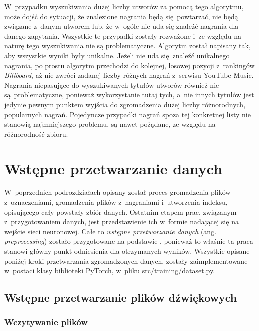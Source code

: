 W~przypadku wyszukiwania dużej liczby utworów za pomocą tego algorytmu, może dojść do sytuacji, że znalezione nagrania będą się powtarzać, nie będą związane z~danym utworem lub, że w~ogóle nie uda się znaleźć nagrania dla danego zapytania. Wszystkie te przypadki zostały rozważone i~ze względu na naturę tego wyszukiwania nie są problematyczne. Algorytm został napisany tak, aby wszystkie wyniki były unikalne. Jeżeli nie uda się znaleźć unikalnego nagrania, po prostu algorytm przechodzi do kolejnej, losowej pozycji z~rankingów \emph{Billboard}, aż nie zwróci zadanej liczby różnych nagrań z~serwisu YouTube Music. Nagrania niepasujące do wyszukiwanych tytułów utworów również nie są problematyczne, ponieważ wykorzystanie tutaj tych, a~nie innych tytułów jest jedynie pewnym punktem wyjścia do zgromadzenia dużej liczby różnorodnych, popularnych nagrań. Pojedyncze przypadki nagrań spoza tej konkretnej listy nie stanowią najmniejszego problemu, są nawet pożądane, ze względu na różnorodność zbioru.

\section{Wstępne przetwarzanie danych} \label{sec:preprocessing}

W~poprzednich podrozdziałach opisany został proces gromadzenia plików z~oznaczeniami, gromadzenia plików z~nagraniami i~utworzenia indeksu, opisującego cały powstały zbiór danych. Ostatnim etapem prac, związanym z~przygotowaniem danych, jest przedstawienie ich w~formie nadającej się na wejście sieci neuronowej. Całe to \emph{wstępne przetwarzanie danych} (ang. \emph{preprocessing}) zostało przygotowane na podstawie \cite{park_bi-directional_2019}, ponieważ to właśnie ta praca stanowi główny punkt odniesienia dla otrzymanych wyników. Wszystkie opisane poniżej kroki przetwarzania zgromadzonych danych, zostały zaimplementowane w~postaci klasy  biblioteki PyTorch, w~pliku \url{src/training/dataset.py}.

\subsection{Wstępne przetwarzanie plików dźwiękowych}

\subsubsection{Wczytywanie plików}

